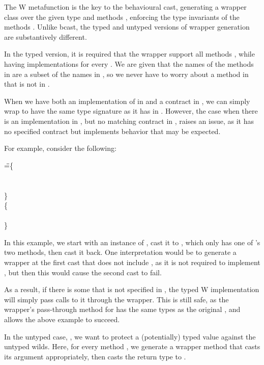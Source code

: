 \documentclass[USenglish]{tex/lipics-v2016}
\begin{document}
The W metafunction is the key to the behavioural cast, generating a wrapper
class \D over the given type \C and methods \md[1], enforcing the type
invariants of the methods \mdp[1]. Unlike bcast, the typed and untyped
versions of wrapper generation are substantively different.

In the typed version, it is required that the wrapper support all methods
\mdp[1], while having implementations for every \md[1]. We are given that the
names of the methods in \mdp[1] are a subset of the names in \md[1], so we
never have to worry about a method in \mdp[1] that is not in \md[1].

When we have both an implementation of \m in \md[1] and a contract \m in
\mdp[1], we can simply wrap \m to have the same type signature as it has in
\mdp[1]. However, the case when there is an implementation \m in \md[1], but
no matching contract in \mdp[1], raises an issue, as it has no specified
contract but implements behavior that may be expected.

For example, consider the following:

\begin{tabbing}
\hspace{1cm}\K\HS
{} \HS\HS\HS\WHERE\HS
  \K\HS =\HS \= \class\= \C \{\\
       \> \HS {}\x\any\any{\HS\x\HS}\\
       \> \HS {}\x\any\any{\HS\x\HS}\\
       \> \}  \\
       \>\class \D \{\\
       \> \HS {}\\
       \> \}
\end{tabbing}

In this example, we start with an instance of , cast it to , which
only has one of 's two methods, then cast it back. One interpretation
would be to generate a wrapper at the first cast that does not include ,
as it is not required to implement , but then this would cause the
second cast to fail.

As a result, if there is some \m that is not specified in \mdp[1], the typed W
implementation will simply pass calls to it through the wrapper. This is still
safe, as the wrapper's pass-through method for \m has the same types as the
original \m, and allows the above example to succeed.

In the untyped case, , we want to protect a (potentially) typed
value against the untyped wilds. Here, for every method \m, we generate a 
wrapper method that casts its argument appropriately, then casts the return
type to \any. 
\end{document}
